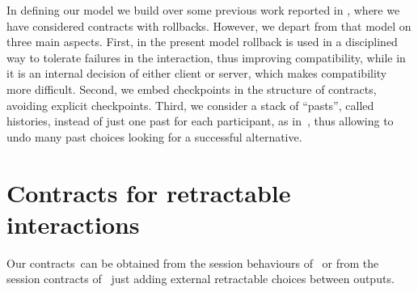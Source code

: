 \documentclass[UKenglish]{eptcs}
\newcommand{\ctrs}{contracts}
\begin{document}
In defining our model we build over some previous work reported in
\cite{BarbaneraDdL14}, where we have considered contracts with
rollbacks. However, we depart from that model on three main
aspects. First, in the present model rollback is used in a
disciplined way to tolerate failures in the interaction, thus
improving compatibility, while in \cite{BarbaneraDdL14} it is an
internal decision of either client or server, which makes
compatibility more difficult. Second, we embed checkpoints in the
structure of contracts, avoiding explicit checkpoints. Third, we
consider a stack of ``pasts'', called histories, instead of just one
past for each participant, as in~\cite{BarbaneraDdL14}, thus allowing
to undo many past choices looking for a successful alternative.


\section{Contracts for retractable interactions}
\label{sect:contracts}
Our \ctrs\ can be obtained from the session behaviours of~\cite{BdL10} or from the session contracts of~\cite{BH13} just adding external retractable choices between outputs.
\end{document}
